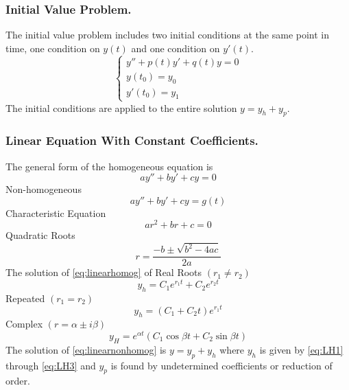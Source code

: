 \documentclass[../../main.tex]{subfiles}
\begin{document}
\subsubsection*{Initial Value Problem.} The initial value problem includes two initial conditions at the same point in time, one condition on $y(t)$ and one condition on $y'(t)$. 
\begin{equation*}
\left\{
\begin{array}{l}
y''+p(t)y'+q(t)y=0\\ y(t_0)=y_0 \\ y'(t_0)=y_1
\end{array} 
\right.
\end{equation*}
The initial conditions are applied to the entire solution $y=y_h+y_p$. 

\subsubsection*{Linear Equation With Constant Coefficients.} The general form of the homogeneous equation is  
\begin{equation}
ay'' + by' + cy=0 \label{eq:linearhomog}
\end{equation}
Non-homogeneous
\begin{equation}
ay''+by'+cy = g(t)\label{eq:linearnonhomog}
\end{equation}
Characteristic Equation
\begin{equation*}
ar^2 + br + c=0
\end{equation*}
Quadratic Roots
\begin{equation}
r=\frac{-b\pm\sqrt{b^2-4ac}}{2a}
\end{equation}
The solution of \eqref{eq:linearhomog} of Real Roots $(r_1 \neq r_2)$
\begin{equation}
y_h = C_1 e^{r_1 t} + C_2 e^{r_2t} \label{eq:LH1}
\end{equation}
Repeated $(r_1 = r_2)$
\begin{equation}
y_h = (C_1 + C_2 t)e^{r_1t}\label{eq:LH2}
\end{equation}
Complex $(r=\alpha\pm i\beta)$
\begin{equation}
y_H=e^{\alpha t}(C_1 \cos \beta t + C_2 \sin \beta t) \label{eq:LH3}
\end{equation}
The solution of \eqref{eq:linearnonhomog} is $y=y_p+y_h$ where $y_h$ is given by \eqref{eq:LH1} through \eqref{eq:LH3} and $y_p$ is found by undetermined coefficients or reduction of order.
\end{document}
